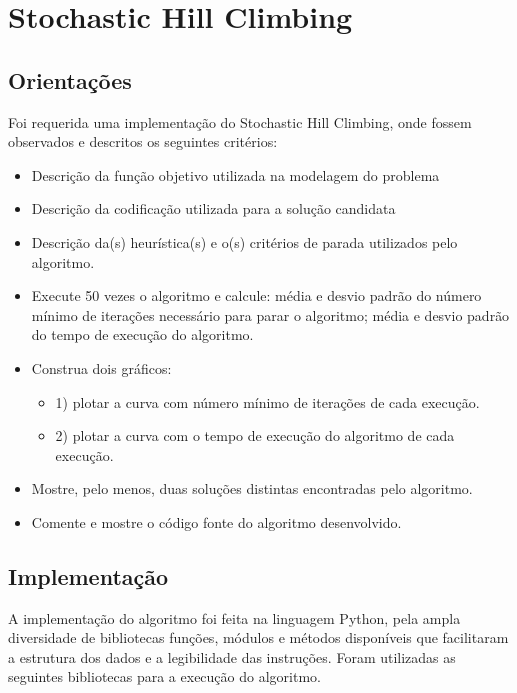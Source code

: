 \section{Stochastic Hill Climbing}

\subsection{Orientações}

Foi requerida uma implementação do Stochastic Hill Climbing, onde fossem observados e descritos os seguintes critérios:

\begin{itemize}
	\item Descrição da função objetivo utilizada na modelagem do problema
	\item Descrição da codificação utilizada para a solução candidata
	\item Descrição da(s) heurística(s) e o(s) critérios de parada utilizados pelo algoritmo.
	\item Execute 50 vezes o algoritmo e calcule: média e desvio padrão do número mínimo de	iterações necessário para parar o algoritmo; média e desvio padrão do tempo de	execução do algoritmo.
	\item Construa dois gráficos:
		\begin{itemize}
			\item 1) plotar a curva com número mínimo de iterações de cada execução.
			\item 2) plotar a curva com o tempo de execução do algoritmo de cada execução.
		\end{itemize}
	\item Mostre, pelo menos, duas soluções distintas encontradas pelo algoritmo.
	\item Comente e mostre o código fonte do algoritmo desenvolvido.
\end{itemize}

\subsection{Implementação}

A implementação do algoritmo foi feita na linguagem Python, pela ampla diversidade de bibliotecas funções, módulos e métodos disponíveis que facilitaram a estrutura dos dados e a legibilidade das instruções. Foram utilizadas as seguintes bibliotecas para a execução do algoritmo.



